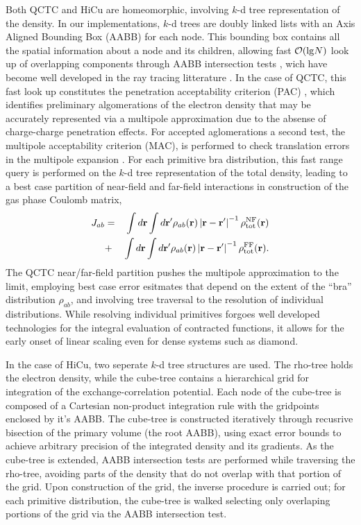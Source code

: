 \commentoutA{\documentclass[prb,aps,twocolumn,showpacs,twocolumngrid,superbib]{revtex4}}
\begin{document}
Both QCTC and HiCu are homeomorphic, involving $k$-d tree representation of the density.  
In our implementations, $k$-d trees are doubly linked lists with an Axis Aligned Bounding Box (AABB) for each node.
This bounding box contains all the spatial information about a node and its children, 
allowing fast ${\cal O}({\rm lg} N)$ look up of overlapping components through AABB intersection tests \cite{}, 
wich have become well developed in the ray tracing litterature \cite{}.
In the case of QCTC, this fast look up constitutes the penetration acceptability criterion (PAC) \cite{}, which identifies
preliminary algomerations of the electron density that may be accurately represented via a multipole 
approximation due to the absense of charge-charge penetration effects.  For accepted aglomerations a second test, 
the multipole acceptability criterion (MAC), is performed to check translation errors in the multipole 
expansion \cite{}.  For each primitive bra distribution, this fast range query is performed on the $k$-d tree 
representation of the total density, leading to a best case partition of near-field and far-field interactions 
in construction of the gas phase Coulomb matrix,
\begin{eqnarray}
J_{ab} &=& \int d {\bf r} \int d {\bf r'} 
\rho_{ab} ({\bf r}) \left|{\bf r}-{\bf r'} \right|^{-1} \rho^{\rm NF}_{\rm tot}({\bf r}) \\
&+&\int d {\bf r} \int d {\bf r'} \rho_{ab} ({\bf r}) \left|{\bf r}-{\bf r'} \right|^{-1} \rho^{\rm FF}_{\rm tot}({\bf r}).
\end{eqnarray}
The QCTC near/far-field partition pushes the multipole approximation to the limit, employing best case error esitmates 
that depend on the extent of the ``bra'' distribution $\rho_{ab}$, and involving tree traversal to the resolution of 
individual distributions.  While resolving individual primitives forgoes well developed technologies for the 
integral evaluation of contracted functions, it allows for the early onset of linear scaling even for dense systems 
such as diamond. 


\newpage
\newpage


In the case of HiCu, two seperate $k$-d tree structures are used.  The rho-tree holds the electron density,
while the cube-tree contains a hierarchical grid for integration of the exchange-correlation potential.  Each node of the 
cube-tree is composed of a Cartesian non-product integration rule with the gridpoints enclosed by it's AABB.
The cube-tree is constructed iteratively through recusrive bisection of the primary volume (the root AABB), using 
exact error bounds to achieve arbitrary precision of the integrated density and its gradients.   As the cube-tree 
is extended, AABB intersection tests are performed while traversing the rho-tree,  avoiding parts of the density 
that do not overlap with that portion of the grid.  Upon construction of the grid,  the inverse procedure is carried out;  
for each primitive distribution, the cube-tree is walked selecting only overlaping portions of the grid via the AABB 
intersection test.
\end{document}
